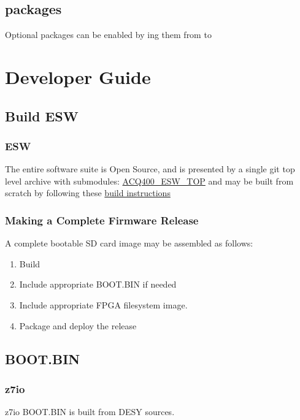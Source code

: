 \documentclass[]{article}
\begin{document}
\subsection{packages}
Optional packages can be enabled by  ing them from  to 

\pagebreak
\section{Developer Guide}

\subsection{Build ESW}

\subsubsection{ESW}
The entire   software suite is Open Source, and is presented by a single git top level archive with submodules:
\href{https://github.com/D-TACQ/ACQ400_ESW_TOP.git}{ACQ400_ESW_TOP}
 and may be built from scratch by following these 
\href{https://github.com/D-TACQ/ACQ400_ESW_TOP/blob/main/README.md}{build instructions}


\subsubsection{Making a Complete Firmware Release}
A complete bootable SD card image may be assembled as follows:
\begin{enumerate}
	\item Build 
	\item Include appropriate BOOT.BIN if needed
	\item Include appropriate FPGA filesystem image.
	\item Package and deploy the release
\end{enumerate}


\subsection{BOOT.BIN}

\subsubsection{z7io}
z7io BOOT.BIN is built from DESY sources.
\end{document}
